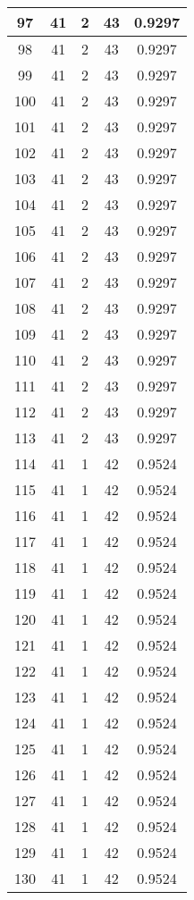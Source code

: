 \documentclass[letterpaper, 12pt]{article}
\begin{document}
\begin{longtable}{|c|c|c|c|c|}
\hline
97 & 41 & 2 & 43 & 0.9297 \\
\hline
98 & 41 & 2 & 43 & 0.9297 \\
\hline
99 & 41 & 2 & 43 & 0.9297 \\
\hline
100 & 41 & 2 & 43 & 0.9297 \\
\hline
101 & 41 & 2 & 43 & 0.9297 \\
\hline
102 & 41 & 2 & 43 & 0.9297 \\
\hline
103 & 41 & 2 & 43 & 0.9297 \\
\hline
104 & 41 & 2 & 43 & 0.9297 \\
\hline
105 & 41 & 2 & 43 & 0.9297 \\
\hline
106 & 41 & 2 & 43 & 0.9297 \\
\hline
107 & 41 & 2 & 43 & 0.9297 \\
\hline
108 & 41 & 2 & 43 & 0.9297 \\
\hline
109 & 41 & 2 & 43 & 0.9297 \\
\hline
110 & 41 & 2 & 43 & 0.9297 \\
\hline
111 & 41 & 2 & 43 & 0.9297 \\
\hline
112 & 41 & 2 & 43 & 0.9297 \\
\hline
113 & 41 & 2 & 43 & 0.9297 \\
\hline
114 & 41 & 1 & 42 & 0.9524 \\
\hline
115 & 41 & 1 & 42 & 0.9524 \\
\hline
116 & 41 & 1 & 42 & 0.9524 \\
\hline
117 & 41 & 1 & 42 & 0.9524 \\
\hline
118 & 41 & 1 & 42 & 0.9524 \\
\hline
119 & 41 & 1 & 42 & 0.9524 \\
\hline
120 & 41 & 1 & 42 & 0.9524 \\
\hline
121 & 41 & 1 & 42 & 0.9524 \\
\hline
122 & 41 & 1 & 42 & 0.9524 \\
\hline
123 & 41 & 1 & 42 & 0.9524 \\
\hline
124 & 41 & 1 & 42 & 0.9524 \\
\hline
125 & 41 & 1 & 42 & 0.9524 \\
\hline
126 & 41 & 1 & 42 & 0.9524 \\
\hline
127 & 41 & 1 & 42 & 0.9524 \\
\hline
128 & 41 & 1 & 42 & 0.9524 \\
\hline
129 & 41 & 1 & 42 & 0.9524 \\
\hline
130 & 41 & 1 & 42 & 0.9524 \\

\end{longtable}
\end{document}
